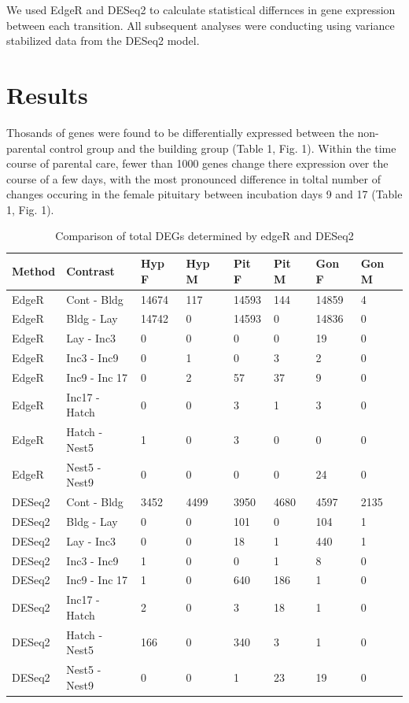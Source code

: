 \documentclass[10pt,letterpaper]{article}
\begin{document}
We used EdgeR and DESeq2 to calculate statistical differnces in gene
expression between each transition. All subsequent analyses were
conducting using variance stabilized data from the DESeq2 model.

\hypertarget{results}{%
\section{Results}\label{results}}

Thosands of genes were found to be differentially expressed between the
non-parental control group and the building group (Table 1, Fig. 1).
Within the time course of parental care, fewer than 1000 genes change
there expression over the course of a few days, with the most pronounced
difference in toltal number of changes occuring in the female pituitary
between incubation days 9 and 17 (Table 1, Fig. 1).

\begin{table}[]
\begin{tabular}{llllllll}
\hline
\textbf{Method} & \textbf{Contrast} & \textbf{Hyp F} & \textbf{Hyp M} & \textbf{Pit F} & \textbf{Pit M} & \textbf{Gon F} & \textbf{Gon M} \\  \hline
EdgeR & Cont - Bldg & 14674 & 117 & 14593 & 144 & 14859 & 4 \\
EdgeR & Bldg - Lay & 14742 & 0 & 14593 & 0 & 14836 & 0 \\
EdgeR & Lay - Inc3 & 0 & 0 & 0 & 0 & 19 & 0 \\
EdgeR & Inc3 - Inc9 & 0 & 1 & 0 & 3 & 2 & 0 \\
EdgeR & Inc9 - Inc 17 & 0 & 2 & 57 & 37 & 9 & 0 \\
EdgeR & Inc17 - Hatch & 0 & 0 & 3 & 1 & 3 & 0 \\
EdgeR & Hatch - Nest5 & 1 & 0 & 3 & 0 & 0 & 0 \\
EdgeR & Nest5 - Nest9 & 0 & 0 & 0 & 0 & 24 & 0 \\  \hline
DESeq2 & Cont - Bldg & 3452 & 4499 & 3950 & 4680 & 4597 & 2135 \\
DESeq2 & Bldg - Lay & 0 & 0 & 101 & 0 & 104 & 1 \\
DESeq2 & Lay - Inc3 & 0 & 0 & 18 & 1 & 440 & 1 \\
DESeq2 & Inc3 - Inc9 & 1 & 0 & 0 & 1 & 8 & 0 \\
DESeq2 & Inc9 - Inc 17 & 1 & 0 & 640 & 186 & 1 & 0 \\
DESeq2 & Inc17 - Hatch & 2 & 0 & 3 & 18 & 1 & 0 \\
DESeq2 & Hatch - Nest5 & 166 & 0 & 340 & 3 & 1 & 0 \\
DESeq2 & Nest5 - Nest9 & 0 & 0 & 1 & 23 & 19 & 0 \\ \hline
\end{tabular}
\caption{Comparison of total DEGs determined by edgeR and DESeq2}
\label{tab:my-table}
\end{table}
\end{document}
